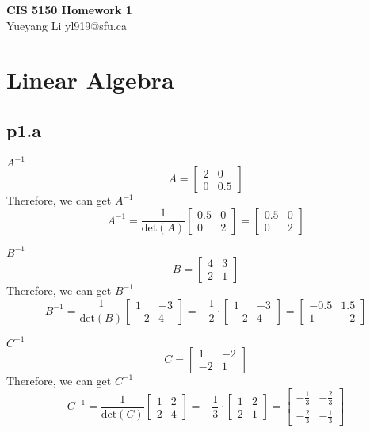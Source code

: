 \documentclass[11pt]{article}
\begin{document}
\begin{center}
{\Large \bf CIS 5150 Homework 1} 
\\
\vspace{0.5cm}
{Yueyang Li yl919@sfu.ca}\\
\end{center}
\vspace{10ex}

\section{Linear Algebra}
\subsection{p1.a}

\(A^{-1}\)
\[
A = \begin{bmatrix}
    2 & 0   \\
    0 & 0.5
\end{bmatrix}
\]
Therefore, we can get \(A^{-1}\)
\[
A^{-1} = \frac{1}{\text{det}(A)}\begin{bmatrix}
    0.5 & 0 \\
    0 & 2
\end{bmatrix} = \begin{bmatrix}
    0.5 & 0\\
    0 & 2
\end{bmatrix}
\]

\(B^{-1}\)
\[
B = \begin{bmatrix}
    4 & 3   \\
    2 & 1
\end{bmatrix}
\]
Therefore, we can get \(B^{-1}\)
\[
B^{-1} = \frac{1}{\text{det}(B)}\begin{bmatrix}
    1 & -3 \\
    -2 & 4
\end{bmatrix} = - \frac{1}{2} \cdot \begin{bmatrix}
    1 & -3 \\
    -2 & 4
\end{bmatrix} = \begin{bmatrix}
    -0.5 & 1.5 \\
    1 & -2
\end{bmatrix}
\]



\(C^{-1}\)
\[
C = \begin{bmatrix}
    1 & -2   \\
    -2 & 1
\end{bmatrix}
\]
Therefore, we can get \(C^{-1}\)
\[
C^{-1} = \frac{1}{\text{det}(C)}\begin{bmatrix}
    1 & 2 \\
    2 & 4
\end{bmatrix} = - \frac{1}{3} \cdot \begin{bmatrix}
    1 & 2 \\
    2 & 1
\end{bmatrix} = \begin{bmatrix}
    -\frac{1}{3} & - \frac{2}{3} \\
    - \frac{2}{3} & - \frac{1}{3}
\end{bmatrix}
\]
\end{document}
